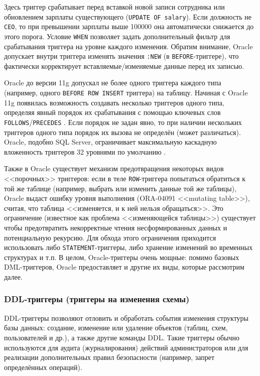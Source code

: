  Здесь триггер срабатывает перед вставкой новой записи сотрудника или обновлением зарплаты существующего (\texttt{UPDATE OF salary}). Если должность не \texttt{CEO}, то при превышении зарплаты выше 100000 она автоматически снижается до этого порога. Условие \texttt{WHEN} позволяет задать дополнительный фильтр для срабатывания триггера на уровне каждого изменения. Обратим внимание, Oracle допускает внутри триггера изменять значения \texttt{:NEW} (в \texttt{BEFORE}-триггере), что фактически корректирует вставляемые/изменяемые данные перед их записью.
 
 Oracle до версии 11g допускал не более одного триггера каждого типа (например, одного \texttt{BEFORE ROW INSERT} триггера) на таблицу. Начиная с Oracle 11g появилась возможность создавать несколько триггеров одного типа, определяя явный порядок их срабатывания с помощью ключевых слов \texttt{FOLLOWS}/\texttt{PRECEDES}  \autocite{oracledbdoc6}. Если порядок не задан явно, то при наличии нескольких триггеров одного типа порядок их вызова не определён (может различаться). Oracle, подобно SQL Server, ограничивает максимальную каскадную вложенность триггеров 32 уровнями по умолчанию  \autocite{oracledbdoc8}. 
 
 Также в Oracle существует механизм предотвращения некоторых видов <<порочных>> триггеров: если в теле \texttt{ROW}-триггера попытаться обратиться к той же таблице (например, выбрать или изменить данные той же таблицы), Oracle выдаст ошибку уровня выполнения (ORA-04091 <<mutating table>>), считая, что таблица <<изменяется, и к ней нельзя обращаться>>. Это ограничение (известное как проблема <<изменяющейся таблицы>>) существует чтобы предотвратить некорректные чтения несформированных данных и потенциальную рекурсию. Для обхода этого ограничения приходится использовать либо \texttt{STATEMENT}-триггеры, либо хранение изменений во временных структурах и т.п. В целом, Oracle-триггеры очень мощные: помимо базовых DML-триггеров, Oracle предоставляет и другие их виды, которые рассмотрим далее.

\subsubsection{DDL-триггеры (триггеры на изменения схемы)}

 DDL-триггеры позволяют отловить и обработать события изменения структуры базы данных: создание, изменение или удаление объектов (таблиц, схем, пользователей и др.), а также другие команды DDL. Такие триггеры обычно используются для аудита (журналирования) действий администраторов или для реализации дополнительных правил безопасности (например, запрет определённых операций).

